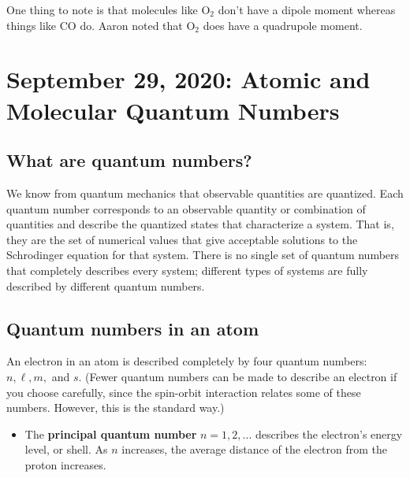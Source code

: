 \documentclass{article}
\begin{document}
One thing to note is that molecules like O$_2$ don't have a dipole moment whereas things like CO do. Aaron noted that O$_2$ does have a quadrupole moment.


\newpage
\section{September 29, 2020: Atomic and Molecular Quantum Numbers}

\subsection{What are quantum numbers?}

We know from quantum mechanics that observable quantities are quantized. Each quantum number corresponds to an observable quantity or combination of quantities and describe the quantized states that characterize a system. That is, they are the set of numerical values that give acceptable solutions to the Schrodinger equation for that system. There is no single set of quantum numbers that completely describes every system; different types of systems are fully described by different quantum numbers.

\subsection{Quantum numbers in an atom}

An electron in an atom is described completely by four quantum numbers: $n, \ell, m,$ and $s$. (Fewer quantum numbers can be made to describe an electron if you choose carefully, since the spin-orbit interaction relates some of these numbers. However, this is the standard way.)

\begin{itemize}
    \item The \textbf{principal quantum number} $n = 1,2,...$ describes the electron's energy level, or shell. As $n$ increases, the average distance of the electron from the proton increases.
\end{itemize}
\end{document}
